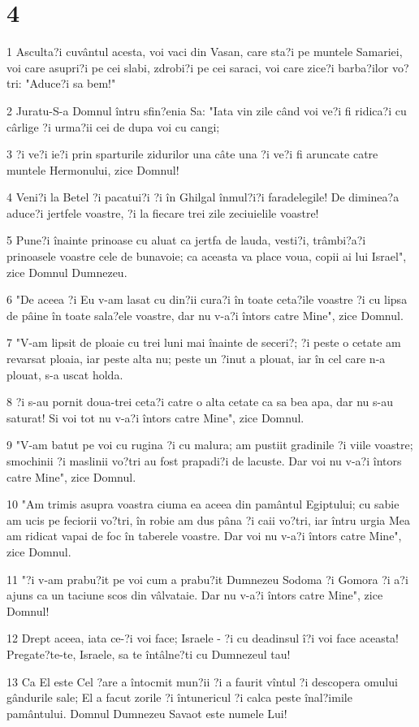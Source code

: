 \chapter{4}

\par 1 Asculta?i cuvântul acesta, voi vaci din Vasan, care sta?i pe muntele Samariei, voi care asupri?i pe cei slabi, zdrobi?i pe cei saraci, voi care zice?i barba?ilor vo?tri: "Aduce?i sa bem!"
\par 2 Juratu-S-a Domnul întru sfin?enia Sa: "Iata vin zile când voi ve?i fi ridica?i cu cârlige ?i urma?ii cei de dupa voi cu cangi;
\par 3 ?i ve?i ie?i prin sparturile zidurilor una câte una ?i ve?i fi aruncate catre muntele Hermonului, zice Domnul!
\par 4 Veni?i la Betel ?i pacatui?i ?i în Ghilgal înmul?i?i faradelegile! De diminea?a aduce?i jertfele voastre, ?i la fiecare trei zile zeciuielile voastre!
\par 5 Pune?i înainte prinoase cu aluat ca jertfa de lauda, vesti?i, trâmbi?a?i prinoasele voastre cele de bunavoie; ca aceasta va place voua, copii ai lui Israel", zice Domnul Dumnezeu.
\par 6 "De aceea ?i Eu v-am lasat cu din?ii cura?i în toate ceta?ile voastre ?i cu lipsa de pâine în toate sala?ele voastre, dar nu v-a?i întors catre Mine", zice Domnul.
\par 7 "V-am lipsit de ploaie cu trei luni mai înainte de seceri?; ?i peste o cetate am revarsat ploaia, iar peste alta nu; peste un ?inut a plouat, iar în cel care n-a plouat, s-a uscat holda.
\par 8 ?i s-au pornit doua-trei ceta?i catre o alta cetate ca sa bea apa, dar nu s-au saturat! Si voi tot nu v-a?i întors catre Mine", zice Domnul.
\par 9 "V-am batut pe voi cu rugina ?i cu malura; am pustiit gradinile ?i viile voastre; smochinii ?i maslinii vo?tri au fost prapadi?i de lacuste. Dar voi nu v-a?i întors catre Mine", zice Domnul.
\par 10 "Am trimis asupra voastra ciuma ea aceea din pamântul Egiptului; cu sabie am ucis pe feciorii vo?tri, în robie am dus pâna ?i caii vo?tri, iar întru urgia Mea am ridicat vapai de foc în taberele voastre. Dar voi nu v-a?i întors catre Mine", zice Domnul.
\par 11 "?i v-am prabu?it pe voi cum a prabu?it Dumnezeu Sodoma ?i Gomora ?i a?i ajuns ca un taciune scos din vâlvataie. Dar nu v-a?i întors catre Mine", zice Domnul!
\par 12 Drept aceea, iata ce-?i voi face; Israele - ?i cu deadinsul î?i voi face aceasta! Pregate?te-te, Israele, sa te întâlne?ti cu Dumnezeul tau!
\par 13 Ca El este Cel ?are a întocmit mun?ii ?i a faurit vîntul ?i descopera omului gândurile sale; El a facut zorile ?i întunericul ?i calca peste înal?imile pamântului. Domnul Dumnezeu Savaot este numele Lui!

